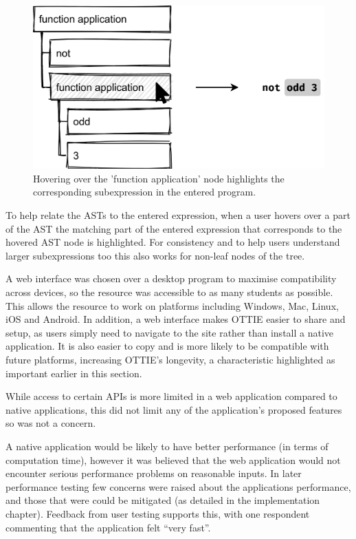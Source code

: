 \documentclass[a4paper,fleqn,oneside,12pt]{report}
\begin{document}
{\centering \begin{figure}[h!]
  \centering
  \includegraphics[width=0.75\linewidth]{images/image26.png}
  \caption{Hovering over the 'function application' node highlights the corresponding subexpression in the entered program.}
\end{figure} \par}

To help relate the ASTs to the entered expression, when a user hovers over a part of the AST the matching part of the entered expression that corresponds to the hovered AST node is highlighted. For consistency and to help users understand larger subexpressions too this also works for non-leaf nodes of the tree.

A web interface was chosen over a desktop program to maximise compatibility across devices, so the resource was accessible to as many students as possible. This allows the resource to work on platforms including Windows, Mac, Linux, iOS and Android. In addition, a web interface makes OTTIE easier to share and setup, as users simply need to navigate to the site rather than install a native application. It is also easier to copy and is more likely to be compatible with future platforms, increasing OTTIE's longevity, a characteristic highlighted as important earlier in this section.

While access to certain APIs is more limited in a web application compared to native applications, this did not limit any of the application's proposed features so was not a concern.

A native application would be likely to have better performance (in terms of computation time), however it was believed that the web application would not encounter serious performance problems on reasonable inputs. In later performance testing few concerns were raised about the applications performance, and those that were could be mitigated (as detailed in the implementation chapter). Feedback from user testing supports this, with one respondent commenting that the application felt ``very fast''.
\end{document}

